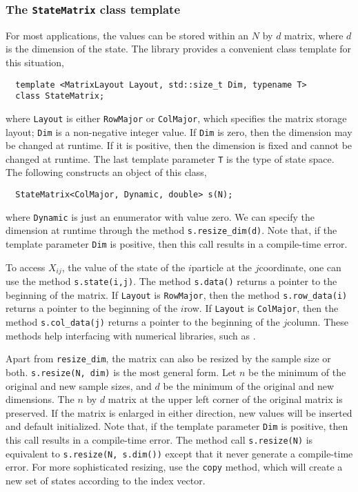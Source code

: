 \subsubsection{The \texttt{StateMatrix} class template}

For most applications, the values can be stored within an $N$ by $d$ matrix,
where $d$ is the dimension of the state. The library provides a convenient
class template for this situation,
\begin{Verbatim}
  template <MatrixLayout Layout, std::size_t Dim, typename T>
  class StateMatrix;
\end{Verbatim}
where \verb|Layout| is either \verb|RowMajor| or \verb|ColMajor|, which
specifies the matrix storage layout; \verb|Dim| is a non-negative integer
value. If \verb|Dim| is zero, then the dimension may be changed at runtime. If
it is positive, then the dimension is fixed and cannot be changed at runtime.
The last template parameter \verb|T| is the \cpp type of state space. The
following constructs an object of this class,
\begin{Verbatim}
  StateMatrix<ColMajor, Dynamic, double> s(N);
\end{Verbatim}
where \verb|Dynamic| is just an enumerator with value zero. We can specify the
dimension at runtime through the method \verb|s.resize_dim(d)|. Note that, if
the template parameter \verb|Dim| is positive, then this call results in a
compile-time error.

To access $X_{ij}$, the value of the state of the $i$\ith particle at the
$j$\ith coordinate, one can use the method \verb|s.state(i,j)|. The method
\verb|s.data()| returns a pointer to the beginning of the matrix. If
\verb|Layout| is \verb|RowMajor|, then the method \verb|s.row_data(i)| returns
a pointer to the beginning of the $i$\ith row. If \verb|Layout| is
\verb|ColMajor|, then the method \verb|s.col_data(j)| returns a pointer to the
beginning of the $j$\ith column. These methods help interfacing with numerical
libraries, such as \blas.

Apart from \verb|resize_dim|, the matrix can also be resized by the sample size
or both. \verb|s.resize(N, dim)| is the most general form. Let $n$ be the
minimum of the original and new sample sizes, and $d$ be the minimum of the
original and new dimensions. The $n$ by $d$ matrix at the upper left corner of
the original matrix is preserved. If the matrix is enlarged in either
direction, new values will be inserted and default initialized. Note that, if
the template parameter \verb|Dim| is positive, then this call results in a
compile-time error. The method call \verb|s.resize(N)| is equivalent to
\verb|s.resize(N, s.dim())| except that it never generate a compile-time error.
For more sophisticated resizing, use the \verb|copy| method, which will create
a new set of states according to the index vector.

